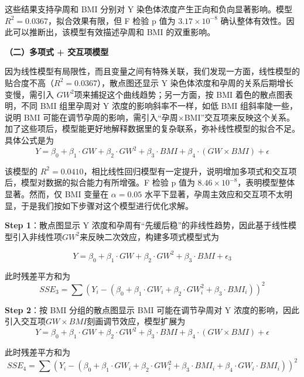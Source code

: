 \documentclass[withoutpreface,bwprint]{cumcmthesis} %
\begin{document}
这些结果支持孕周和 BMI 分别对 Y 染色体浓度产生正向和负向显著影响。模型 $R^2 = 0.0367$，拟合效果有限，但 F 检验 p 值为 $3.17 \times 10^{-8}$
确认整体有效性。因此可以推断出，该模型有效描述孕周和 BMI 的双重影响。


\textbf{（二）多项式 + 交互项模型}

因为线性模型有局限性，而且变量之间有特殊关联，我们发现一方面，线性模型的贴合度不高（$R^2=0.0367$），散点图还显示 Y 染色体浓度和孕周的关系后期增长变慢，需引入 $GW^2$项来捕捉这个曲线趋势；另一方面，按 BMI 着色的散点图表明，不同 BMI 组里孕周对 Y 浓度的影响斜率不一样，如低 BMI 组斜率陡一些，说明 BMI 可能在调节孕周的影响，需引入“孕周×BMI”交互项来反映这个关系。加了这些项后，模型能更好地解释数据里的复杂联系，弥补线性模型的拟合不足。具体公式是为
\begin{equation}
    \label{eq:多项式 + 交互项模型}
    Y = \beta_0 + \beta_1 \cdot GW + \beta_2 \cdot GW^2 + \beta_3 \cdot BMI + \beta_4 \cdot (GW \times BMI) + \epsilon
\end{equation}

该模型的 $R^2 = 0.0410$，相比线性回归模型有一定提升，说明增加多项式和交互项后，模型对数据的拟合能力有所增强。F 检验 p 值为 $8.46 \times 10^{-8}$，表明模型整体显著。然而，仅 BMI 变量在 $\alpha = 0.05$ 水平下显著，孕周主效应和交互项不太明显，于是我们按如下步骤对这个模型进行优化求解。

\textbf{Step 1}：散点图显示 Y 浓度和孕周有“先缓后稳”的非线性趋势，因此基于线性模型引入非线性项$GW^2$来反映二次效应，构建多项式模型式为

\begin{equation}
    Y = \beta_0 + \beta_1 \cdot GW + \beta_2 \cdot GW^2 + \beta_3 \cdot BMI + \epsilon_3
\end{equation}

此时残差平方和为
\begin{equation}
    SSE_3 = \sum (Y_i - (\beta_0 + \beta_1 \cdot GW_i + \beta_2 \cdot GW_i^2 + \beta_3 \cdot BMI_i))^2
\end{equation}

\textbf{Step 2}：按 BMI 分组的散点图显示 BMI 可能在调节孕周对 Y 浓度的影响，因此引入交互项$GW \times BMI$刻画调节效应，模型扩展为
  \begin{equation}
    Y = \beta_0 + \beta_1 \cdot GW + \beta_2 \cdot GW^2 + \beta_3 \cdot BMI + \beta_4 \cdot (GW \times BMI) + \epsilon
  \end{equation} 
  
  此时残差平方和为
  \begin{equation}
    SSE_4 = \sum (Y_i - (\beta_0 + \beta_1 \cdot GW_i + \beta_2 \cdot GW_i^2 + \beta_3 \cdot BMI_i + \beta_4 \cdot GW_i \cdot BMI_i))^2
  \end{equation}
\end{document}
